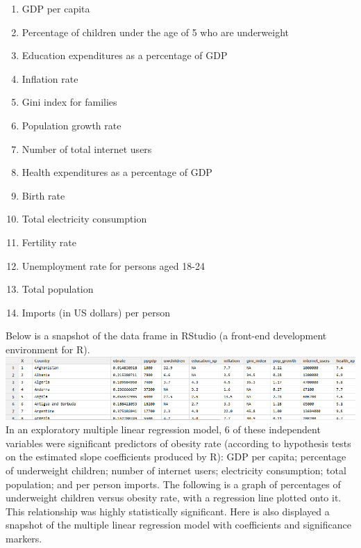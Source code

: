 \documentclass[oneside,12pt]{report}
\begin{document}
\begin{enumerate}

\item GDP per capita

\item Percentage of children under the age of 5 who are underweight

\item Education expenditures as a percentage of GDP

\item Inflation rate

\item Gini index for families

\item Population growth rate

\item Number of total internet users

\item Health expenditures as a percentage of GDP

\item Birth rate

\item Total electricity consumption

\item Fertility rate

\item Unemployment rate for persons aged 18-24

\item Total population

\item Imports (in US dollars) per person

\end{enumerate}


Below is a snapshot of the data frame in RStudio (a front-end development environment for R).
\\

\includegraphics[width=\textwidth]{dataframe_snapshot.png}\\

In an exploratory multiple linear regression model, 6 of these independent variables were significant predictors of obesity rate (according to hypothesis tests on the estimated slope coefficients produced by R): GDP per capita; percentage of underweight children; number of internet users; electricity consumption; total population; and per person imports. The following is a graph of percentages of underweight children versus obesity rate, with a regression line plotted onto it. This relationship was highly statistically significant. Here is also displayed a snapshot of the multiple linear regression model with coefficients and significance markers.
\end{document}
